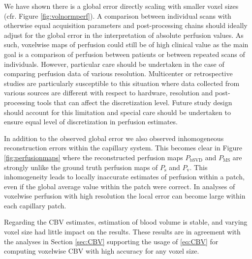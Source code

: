 \documentclass[aps,prb,article,groupedaddress,showkeys]{revtex4}
\begin{document}
We have shown there is a global error directly scaling with smaller voxel sizes (cfr. Figure \ref{fig:volnormperf}). A comparison between individual scans with otherwise equal acquisition parameters and post-processing chains should ideally adjust for the global error in the interpretation of absolute perfusion values. As such, voxelwise maps of perfusion could still be of high clinical value as the main goal is a comparison of perfusion between patients or between repeated scans of individuals. However, particular care should be undertaken in the case of comparing perfusion data of various resolution. Multicenter or retrospective studies are particularly susceptible to this situation where data collected from various sources are different with respect to hardware, resolution and post-processing tools that can affect the discretization level. Future study design should account for this limitation and special care should be undertaken to ensure equal level of discretization in perfusion estimates. 

In addition to the observed global error we also observed inhomogeneous reconstruction errors within the capillary system. This becomes clear in Figure \ref{fig:perfusionmaps} where the reconstructed perfusion maps $P_{\mathrm{bSVD}}$ and $P_{\mathrm{MS}}$ are strongly unlike the ground truth perfusion maps of $P_{\mathrm{s}}$ and $P_{\mathrm{v}}$. This inhomogeneity leads to locally inaccurate estimates of perfusion within a patch, even if the global average value within the patch were correct. 
In analyses of voxelwise perfusion with high resolution the local error can become large within each capillary patch.
 
	Regarding the CBV estimates, estimation of blood volume is stable, and varying voxel size had little impact on the results. These results are in agreement with the analyses in Section \ref{sec:CBV} supporting the usage of \eqref{eq:CBV} for computing voxelwise CBV with high accuracy for any voxel size.
	
\end{document}
